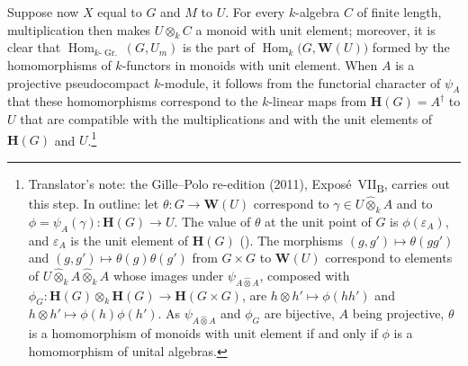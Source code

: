 Suppose now \(X\) equal to \(G\) and \(M\) to \(U\). For every
\(k\)-algebra \(C\) of finite length, multiplication then makes
\(U\otimes_kC\) a monoid with unit element; moreover, it is clear that
\(\operatorname{Hom}_{k\text{-}\operatorname{Gr.}}(G,U_m)\) is the part
of \(\operatorname{Hom}_k\bigl(G,\mathbf W(U)\bigr)\) formed by the
homomorphisms of \(k\)-functors in monoids with unit element. When
\(A\) is a projective pseudocompact \(k\)-module, it follows from the
functorial character of \(\psi_A\) that these homomorphisms correspond
to the \(k\)-linear maps from \(\mathbf H(G)=A^\dagger\) to \(U\) that
are compatible with the multiplications and with the unit elements of
\(\mathbf H(G)\) and \(U\).\footnote{Translator's note: the Gille--Polo re-edition (2011),
Exposé~VII\textsubscript{B}, carries out this step. In outline: let
\(\theta:G\to\mathbf W(U)\) correspond to \(\gamma\in U\widehat\otimes_kA\) and
to \(\phi=\psi_A(\gamma):\mathbf H(G)\to U\). The value of \(\theta\) at the
unit point of \(G\) is \(\phi(\varepsilon_A)\), and \(\varepsilon_A\) is the
unit element of \(\mathbf H(G)\) \textup{()}. The morphisms
\((g,g')\mapsto\theta(gg')\) and \((g,g')\mapsto\theta(g)\theta(g')\) from
\(G\times G\) to \(\mathbf W(U)\) correspond to elements of
\(U\widehat\otimes_kA\widehat\otimes_kA\) whose images under
\(\psi_{A\widehat\otimes A}\), composed with
\(\phi_G:\mathbf H(G)\otimes_k\mathbf H(G)\to\mathbf H(G\times G)\), are
\(h\otimes h'\mapsto\phi(hh')\) and \(h\otimes h'\mapsto\phi(h)\phi(h')\). As
\(\psi_{A\widehat\otimes A}\) and \(\phi_G\) are bijective, \(A\) being
projective, \(\theta\) is a homomorphism of monoids with unit element if and
only if \(\phi\) is a homomorphism of unital algebras.}
